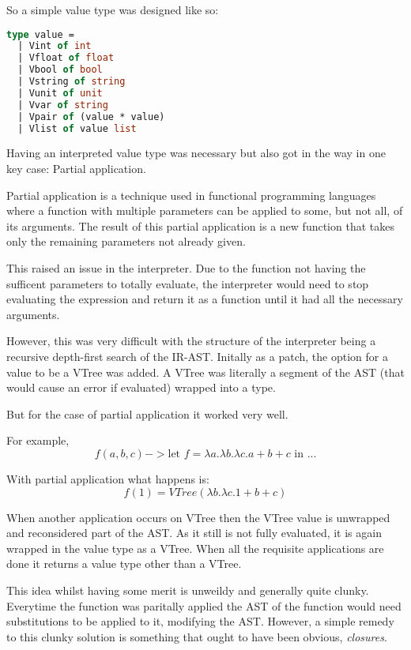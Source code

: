 \documentclass{l4proj}
\begin{document}
So a simple value type was designed like so:

\begin{lstlisting}[language=Caml, caption="PyFunc's Interpreter value type definition.]
type value = 
  | Vint of int 
  | Vfloat of float
  | Vbool of bool 
  | Vstring of string 
  | Vunit of unit 
  | Vvar of string 
  | Vpair of (value * value)
  | Vlist of value list
\end{lstlisting}

Having an interpreted value type was necessary but also got in the way in one key case: Partial application.

Partial application is a technique used in functional programming languages where a function with multiple parameters can be applied to some, but not all, of its arguments.
The result of this partial application is a new function that takes only the remaining parameters not already given.

This raised an issue in the interpreter.
Due to the function not having the sufficent parameters to totally evaluate, the interpreter would need to stop evaluating the expression and return it as a function until it had all the necessary arguments.

However, this was very difficult with the structure of the interpreter being a recursive depth-first search of the IR-AST.
Initally as a patch, the option for a value to be a VTree was added.
A VTree was literally a segment of the AST (that would cause an error if evaluated) wrapped into a type.

But for the case of partial application it worked very well.

For example, \[ f(a, b, c) -> \text{let } f = \lambda a. \lambda b. \lambda c. a + b + c \text{ in ...}\]

With partial application what happens is: 
\[f (1) = VTree (\lambda b. \lambda c. 1 + b + c)\]

When another application occurs on VTree then the VTree value is unwrapped and reconsidered part of the AST.
As it still is not fully evaluated, it is again wrapped in the value type as a VTree.
When all the requisite applications are done it returns a value type other than a VTree.

This idea whilst having some merit is unweildy and generally quite clunky.
Everytime the function was paritally applied the AST of the function would need substitutions to be applied to it, modifying the AST.
However, a simple remedy to this clunky solution is something that ought to have been obvious, \emph{closures}.
\end{document}
